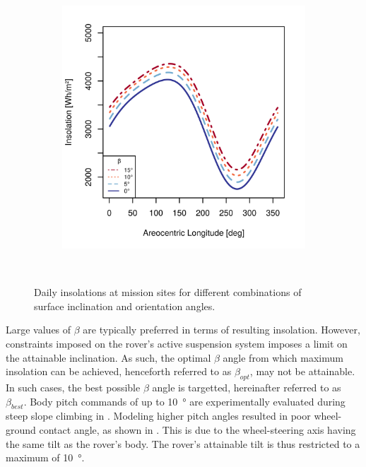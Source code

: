 \begin{figure}[h]
\begin{subfigure}[t]{\subfigureWidth}
            \includegraphics[height=\graphicsHeight]{sections/mars-solar-energy/mission-sites/plots/ismenius-cavus-solar-insolations-for-different-beta-inclinations.png}
            \label{fig:plot:sub:solar-insolations-for-different-beta-ismenius-cavus}
    \end{subfigure}\\[0.8ex]
    \caption[Daily insolations at mission sites]
    {Daily insolations at mission sites for different combinations of surface inclination and orientation angles.}
    \label{fig:plot:solar-insolations-for-different-beta}
\vspace{-2ex}
\end{figure}

Large values of $\beta$ are typically preferred in terms of resulting insolation. However, constraints imposed on the rover's active suspension system imposes a limit on the attainable inclination. As such, the optimal $\beta$ angle from which maximum insolation can be achieved, henceforth referred to as $\beta_{opt}$, may not be attainable. In such cases, the best possible $\beta$ angle is targetted, hereinafter referred to as $\beta_{best}$. Body pitch commands of up to \SI{10}{\degree} are experimentally evaluated during steep slope climbing in . Modeling higher pitch angles resulted in poor wheel-ground contact angle, as shown in . This is due to the wheel-steering axis having the same tilt as the rover's body. The rover's attainable tilt is thus restricted to a maximum of \SI{10}{\degree}.

